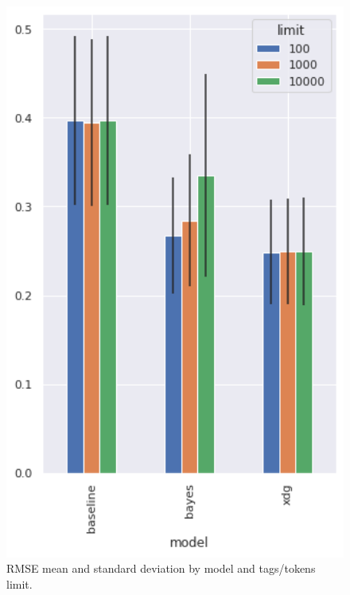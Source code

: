 \documentclass[sn-mathphys]{sn-jnl}%
\theoremstyle{thmstyleone}%
\theoremstyle{thmstyletwo}%
\theoremstyle{thmstylethree}%
\begin{document}
\begin{figure}[h!]
      \centering
      \includegraphics[width=1\textwidth]{images/rmse_by_model_and_limit.png}
      \caption{RMSE mean and standard deviation by model and tags/tokens limit.}
      \label{fig:rmse_by_model_and_limit}
\end{figure}
\end{document}
